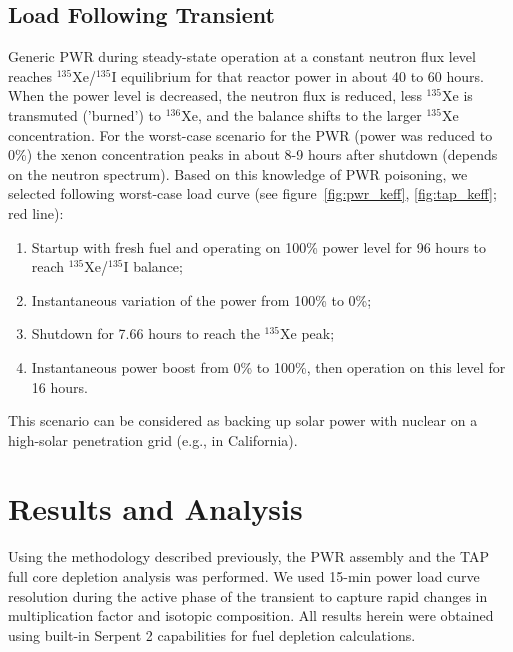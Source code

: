 \documentclass{anstrans}
\begin{document}
\subsection{Load Following Transient}
Generic \gls{PWR} during steady-state operation at a constant neutron flux 
level reaches $^{135}$Xe/$^{135}$I equilibrium for that reactor power in about 
40 to 60 hours. When the power level is decreased, the neutron flux is reduced, 
less $^{135}$Xe is transmuted ('burned') to $^{136}$Xe, and the balance shifts 
to the larger $^{135}$Xe concentration. For the worst-case scenario for the 
\gls{PWR} (power was reduced to 0\%) the xenon concentration peaks in about 
8-9 hours after shutdown (depends on the neutron spectrum). Based on this 
knowledge of \gls{PWR} poisoning, we selected following worst-case load curve 
(see figure~\ref{fig:pwr_keff}, 
\ref{fig:tap_keff}; red line):
\begin{enumerate}
	\item Startup with fresh fuel and operating on 
	100\% power level for 96 hours to reach $^{135}$Xe/$^{135}$I balance;
	\item Instantaneous variation of the power from 100\% to 0\%;
	\item Shutdown for 7.66 hours to reach the $^{135}$Xe peak;
	\item Instantaneous power boost from 0\% to 100\%, then operation on 
	this level for 16 hours.
\end{enumerate}
This scenario can be considered as backing up solar power with nuclear on a 
high-solar penetration grid (e.g., in California).

\section{Results and Analysis}
Using the methodology described previously, the \gls{PWR} assembly and 
the \gls{TAP} full core depletion analysis was performed. 
We used 15-min power load curve resolution during the active phase of the 
transient to capture rapid changes in multiplication factor and isotopic 
composition. All results herein were obtained using built-in Serpent 2 
capabilities for fuel depletion calculations.
\end{document}
